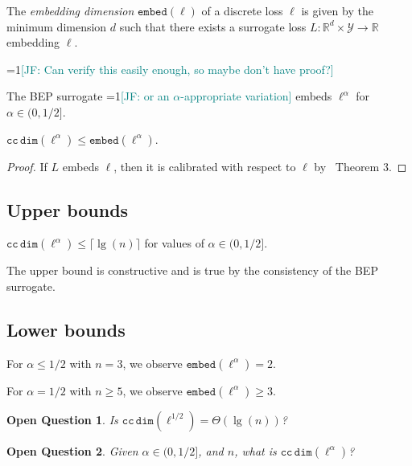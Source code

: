\documentclass[anon,12pt]{colt2021} %
\newcommand{\Comments}{1}
\newcommand{\mynote}[2]{\ifnum\Comments=1\textcolor{#1}{#2}\fi}
\newcommand{\jessie}[1]{\mynote{teal}{[JF: #1]}}
\newcommand{\reals}{\mathbb{R}}
\newcommand{\ccdim}{\mathtt{cc\,dim}}
\newcommand{\embed}{\mathtt{embed}}
\newcommand{\Y}{\mathcal{Y}}
\newtheorem{openq}{Open Question}
\begin{document}
\begin{definition}
	The \emph{embedding dimension} $\embed(\ell)$ of a discrete loss $\ell$ is given by the minimum dimension $d$ such that there exists a surrogate loss $L : \reals^d \times \Y \to \reals$ embedding $\ell$.
\end{definition}

\jessie{Can verify this easily enough, so maybe don't have proof?}
\begin{proposition}
	The BEP surrogate \jessie{or an $\alpha$-appropriate variation} embeds $\ell^\alpha$ for $\alpha \in (0,1/2]$.
\end{proposition}


\begin{proposition}
	$\ccdim(\ell^\alpha) \leq \embed(\ell^\alpha)$.
\end{proposition}
\begin{proof}
	If $L$ embeds $\ell$, then it is calibrated with respect to $\ell$ by~\cite{finocchiaro2019embedding} Theorem 3.
\end{proof}

\subsection{Upper bounds}
\begin{theorem}
	$\ccdim(\ell^{\alpha}) \leq \lceil \lg(n) \rceil$ for values of $\alpha \in (0,1/2]$.
\end{theorem}
The upper bound is constructive and is true by the consistency of the BEP surrogate.

\subsection{Lower bounds}
\begin{theorem}
	For $\alpha \leq 1/2$ with $n = 3$, we observe $\embed(\ell^\alpha) = 2$.
\end{theorem}


\begin{theorem}
	For $\alpha = 1/2$ with $n \geq 5$, we observe $\embed(\ell^\alpha) \geq 3$.
\end{theorem}

\begin{openq}
	Is $\ccdim(\ell^{1/2}) = \Theta(\lg(n))$?
\end{openq}

\begin{openq}
	Given $\alpha \in (0,1/2]$, and $n$, what is $\ccdim(\ell^{\alpha})$?
\end{openq}
\end{document}
